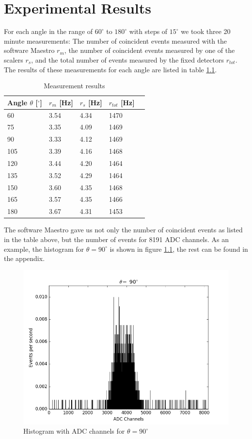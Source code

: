 \documentclass[a4paper,parskip,11pt, DIV12]{scrreprt}
\begin{document}
\chapter{Experimental Results}
For each angle in the range of $60^{\circ}$ to $180^{\circ}$ with steps of $15^{\circ}$ we took three 20 minute measurements: The number of coincident events measured with the software Maestro $r_m$, the number of coincident events measured by one of the scalers $r_s$, and the total number of events measured by the fixed detectors $r_{tot}$. The results of these measurements for each angle are listed in table \ref{tab:measurement}. 
%
\begin{table}[H]\label{tab:measurement}
\begin{center}
\begin{tabular}{lllll}
Angle $\theta$ [$^{\circ}$] & $r_{m}$ [Hz] & $r_{s}$ [Hz] & $r_{tot}$ [Hz]\\
\hline
60 	& 3.54 & 4.34 & 1470\\
75 	& 3.35 & 4.09 & 1469\\
90 	& 3.33 & 4.12 & 1469\\
105 	& 3.39 & 4.16 & 1468\\
120	& 3.44 & 4.20 & 1464\\
135	& 3.52 & 4.29 & 1464\\
150	& 3.60 & 4.35 & 1468\\
165	& 3.57 & 4.35 & 1466\\
180	& 3.67 & 4.31 & 1453\\ 
\end{tabular}
\caption{Measurement results}
\label{tab:measurement}
\end{center}
\end{table}
%
The software Maestro gave us not only the number of coincident events as listed in the table above, but the number of events for 8191 ADC channels. As an example, the histogram for $\theta = 90^{\circ}$ is shown in figure \ref{fig:histogramraw}, the rest can be found in the appendix.
%
\begin{figure}[H]
\centering
\includegraphics[scale=0.65]{90degraw.png}
\caption[Histogram]{Histogram with ADC channels for $\theta = 90^{\circ}$}
\label{fig:histogramraw}
\end{figure}
%
\end{document}
